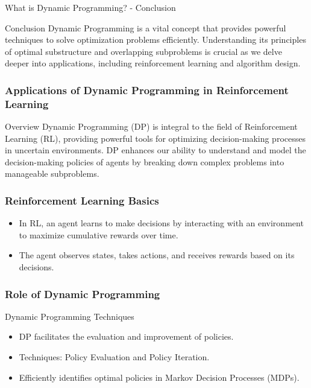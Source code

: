 \documentclass[aspectratio=169]{beamer}
\begin{document}
\begin{frame}[fragile]{What is Dynamic Programming? - Conclusion}
    \begin{block}{Conclusion}
        Dynamic Programming is a vital concept that provides powerful techniques to solve optimization problems efficiently. Understanding its principles of optimal substructure and overlapping subproblems is crucial as we delve deeper into applications, including reinforcement learning and algorithm design.
    \end{block}
\end{frame}

\begin{frame}[fragile]
    \frametitle{Applications of Dynamic Programming in Reinforcement Learning}
    \begin{block}{Overview}
        Dynamic Programming (DP) is integral to the field of Reinforcement Learning (RL), providing powerful tools for optimizing decision-making processes in uncertain environments. DP enhances our ability to understand and model the decision-making policies of agents by breaking down complex problems into manageable subproblems.
    \end{block}
\end{frame}

\begin{frame}[fragile]
    \frametitle{Reinforcement Learning Basics}
    \begin{itemize}
        \item In RL, an agent learns to make decisions by interacting with an environment to maximize cumulative rewards over time.
        \item The agent observes states, takes actions, and receives rewards based on its decisions.
    \end{itemize}
\end{frame}

\begin{frame}[fragile]
    \frametitle{Role of Dynamic Programming}
    \begin{block}{Dynamic Programming Techniques}
        \begin{itemize}
            \item DP facilitates the evaluation and improvement of policies.
            \item Techniques: Policy Evaluation and Policy Iteration.
            \item Efficiently identifies optimal policies in Markov Decision Processes (MDPs).
        \end{itemize}
    \end{block}
\end{frame}
\end{document}
